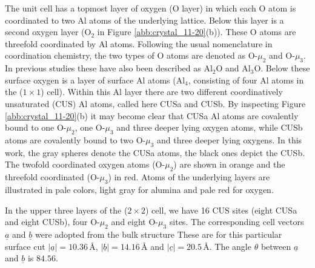 \documentclass[11pt,DIV=13,BCOR=5mm,a4paper,headinclude]{scrbook}
\renewcommand{\vec}[1]{\underline{#1}}
\begin{document}
The unit cell has a topmost layer of oxygen (O layer) in which each O atom is coordinated to two Al atoms of the underlying lattice.
Below this layer is a second oxygen layer (O$_2$ in Figure \ref{abb:crystal_11-20}(b)).
These O atoms are threefold coordinated by Al atoms.
Following the usual nomenclature in coordination chemistry, the two types of O atoms are denoted as O-$\mu_2$ and O-$\mu_3$.
In previous studies these have also been described as Al$_2$O and Al$_3$O\cite{sung}.
Below these surface oxygen is a layer of surface Al atoms (Al$_4$, consisting of four Al atoms in the ($1\times 1$) cell).
Within this Al layer there are two different coordinatively unsaturated (CUS) Al atoms, called here CUSa and CUSb.
By inspecting Figure \ref{abb:crystal_11-20}(b) it may become clear that CUSa Al atoms are covalently bound to one O-$\mu_2$, one O-$\mu_3$ and three deeper lying oxygen atoms, while CUSb atoms are covalently bound to two O-$\mu_3$ and three deeper lying oxygens.
In this work, the gray spheres denote the CUSa atoms, the black ones depict the CUSb.
The twofold coordinated oxygen atoms (O-$\mu_2$) are shown in orange and the threefold coordinated (O-$\mu_3$) in red.
Atoms of the underlying layers are illustrated in pale colors, light gray for alumina and pale red for oxygen.

In the upper three layers of the ($2\times 2$) cell, we have 16 CUS sites (eight CUSa and eight CUSb), four O-$\mu_2$ and eight O-$\mu_3$ sites.
The corresponding cell vectors $\vec{a}$ and $\vec{b}$ were adopted from the bulk structure
These are for this particular surface cut $|\vec{a}|=10.36\,$\AA, $|\vec{b}|=14.16\,$\AA{} and $|\vec{c}|=20.5\,$\AA.
The angle $\theta$ between $\vec{a}$ and $\vec{b}$ is $84.56$\textdegree{}.
\end{document}
